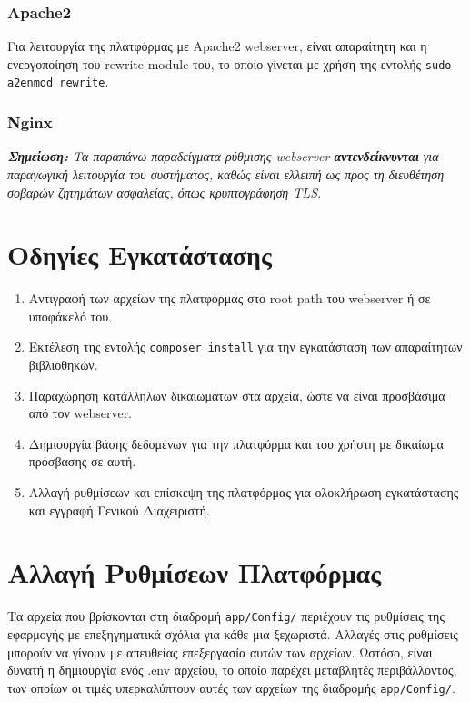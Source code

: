 \subsubsection{Apache2}


Για λειτουργία της πλατφόρμας με Apache2 webserver, είναι απαραίτητη και η ενεργοποίηση του rewrite module του, το οποίο γίνεται με χρήση της εντολής \verb!sudo a2enmod rewrite!.

\subsubsection{Nginx}


\textit{\textbf{Σημείωση:} Τα παραπάνω παραδείγματα ρύθμισης webserver \textbf{αντενδείκνυνται} για παραγωγική λειτουργία του συστήματος, καθώς είναι ελλειπή ως προς τη διευθέτηση σοβαρών ζητημάτων ασφαλείας, όπως κρυπτογράφηση TLS.}

\section{Οδηγίες Εγκατάστασης}
\begin{enumerate}
	\item Αντιγραφή των αρχείων της πλατφόρμας στο root path του webserver ή σε υποφάκελό του.
	\item Εκτέλεση της εντολής \verb!composer install! για την εγκατάσταση των απαραίτητων βιβλιοθηκών.
	\item Παραχώρηση κατάλληλων δικαιωμάτων στα αρχεία, ώστε να είναι προσβάσιμα από τον webserver.
	\item Δημιουργία βάσης δεδομένων για την πλατφόρμα και του χρήστη με δικαίωμα πρόσβασης σε αυτή.
	\item Αλλαγή ρυθμίσεων και επίσκεψη της πλατφόρμας για ολοκλήρωση εγκατάστασης και εγγραφή Γενικού Διαχειριστή.
\end{enumerate}

\section{Αλλαγή Ρυθμίσεων Πλατφόρμας}
Τα αρχεία που βρίσκονται στη διαδρομή \verb!app/Config/! περιέχουν τις ρυθμίσεις της εφαρμογής με επεξηγηματικά σχόλια για κάθε μια ξεχωριστά. Αλλαγές στις ρυθμίσεις μπορούν να γίνουν με απευθείας επεξεργασία αυτών των αρχείων. Ωστόσο, είναι δυνατή η δημιουργία ενός .env αρχείου, το οποίο παρέχει μεταβλητές περιβάλλοντος, των οποίων οι τιμές υπερκαλύπτουν αυτές των αρχείων της διαδρομής \verb!app/Config/!.

